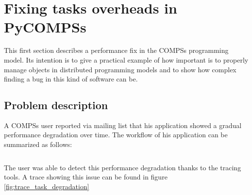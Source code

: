 \newpage
\section{Fixing tasks overheads in PyCOMPSs}
\label{sec:task_overhead}
This first section describes a performance fix in the COMPSs programming model. Its intention is to give a practical example of how important is to properly manage objects in distributed programming models and to show how complex finding a bug in this kind of software can be.

\subsection{Problem description}
A COMPSs user reported via mailing list that his application showed a gradual performance degradation over time. The workflow of his application can be summarized as follows:

\inputminted{python}{applications/TASK_OVERHEAD/main.py}

The user was able to detect this performance degradation thanks to the tracing tools. A trace showing this issue can be found in figure \ref{fig:trace_task_degradation}



